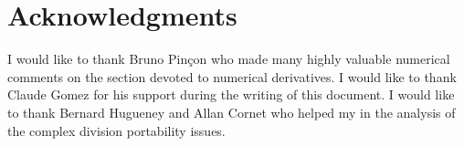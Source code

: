 %

\section{Acknowledgments}
I would like to thank Bruno Pin{\c c}on who made many highly valuable numerical 
comments on the section devoted to numerical derivatives.
I would like to thank Claude Gomez for his support during the writing of 
this document.
I would like to thank Bernard Hugueney and Allan Cornet who helped my in the 
analysis of the complex division portability issues.

